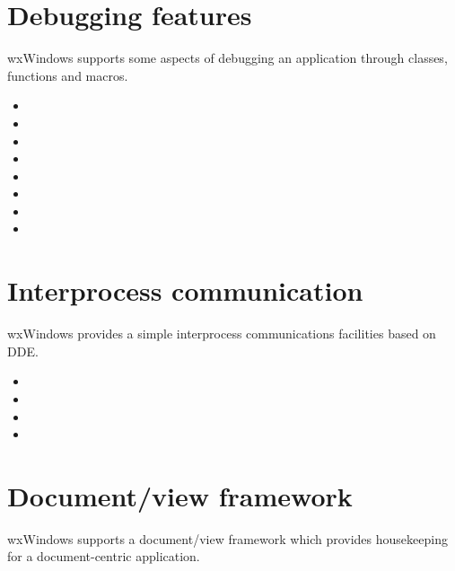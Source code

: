 \section{Debugging features}


wxWindows supports some aspects of debugging an application through
classes, functions and macros.

\begin{itemize}\itemsep=0pt
\item {}
\item {}
\item {}
\item {}
\item {}
\item {}
\item {}
\item {}
\end{itemize}

\section{Interprocess communication}


wxWindows provides a simple interprocess communications facilities
based on DDE.

\begin{itemize}\itemsep=0pt
\item {}
\item {}
\item {}
\item {}
\end{itemize}

\section{Document/view framework}


wxWindows supports a document/view framework which provides
housekeeping for a document-centric application.

